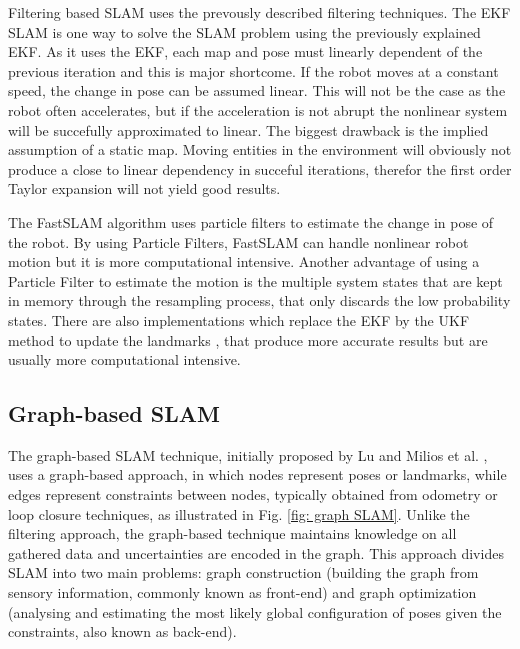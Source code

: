 Filtering based \acs*{SLAM} uses the prevously described filtering techniques. The \acs*{EKF} \acs*{SLAM} is one way to solve the \acs*{SLAM} problem using the previously explained \acl*{EKF}. As it uses the \acs*{EKF}, each map and pose must linearly dependent of the previous iteration and this is major shortcome. If the robot moves at a constant speed, the change in pose can be assumed linear. This will not be the case as the robot often accelerates, but if the acceleration is not abrupt the nonlinear system will be succefully approximated to linear. The biggest drawback is the implied assumption of a static map. Moving entities in the environment will obviously not produce a close to linear dependency in succeful iterations, therefor the first order Taylor expansion will not yield good results. 


The FastSLAM algorithm \cite{thrun_fastslam_nodate} uses particle filters to estimate the change in pose of the robot. By using Particle Filters, FastSLAM can handle nonlinear robot motion but it is more computational intensive. Another advantage of using a Particle Filter to estimate the motion is the multiple system states that are kept in memory through the resampling process, that only discards the low probability states. There are also implementations which replace the \acs*{EKF} by the \acs*{UKF} method to update the landmarks \cite{wang_upf-ukf_2007}, that produce more accurate results but are usually more computational intensive.


\subsection{Graph-based \acs*{SLAM}}

The graph-based \acs*{SLAM} technique, initially proposed by Lu and Milios et al. \cite{lu_globally_1997}, uses a graph-based approach, in which nodes represent poses or landmarks, while edges represent constraints between nodes, typically obtained from odometry or loop closure techniques, as illustrated in Fig. \ref*{fig: graph SLAM}. Unlike the filtering approach, the graph-based technique maintains knowledge on all gathered data and uncertainties are encoded in the graph. This approach divides \acs*{SLAM} into two main problems: graph construction (building the graph from sensory information, commonly known as front-end) and graph optimization (analysing and estimating the most likely global configuration of poses given the constraints, also known as back-end).

